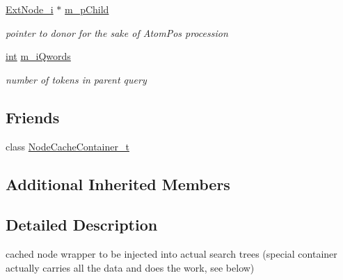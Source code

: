 \begin{DoxyCompactItemize}
\hyperlink{classExtNode__i}{Ext\-Node\-\_\-i} $\ast$ \hyperlink{classExtNodeCached__t_af2ff5acd56311745d3eb4dc63b4ce5f9}{m\-\_\-p\-Child}
\begin{DoxyCompactList}\small\item\em pointer to donor for the sake of Atom\-Pos procession \end{DoxyCompactList}\item 
\hyperlink{sphinxexpr_8cpp_a4a26e8f9cb8b736e0c4cbf4d16de985e}{int} \hyperlink{classExtNodeCached__t_a580c8b573809e90bf4bde6059e3f6132}{m\-\_\-i\-Qwords}
\begin{DoxyCompactList}\small\item\em number of tokens in parent query \end{DoxyCompactList}\end{DoxyCompactItemize}
\subsection*{Friends}
\begin{DoxyCompactItemize}
\item 
class \hyperlink{classExtNodeCached__t_ad23beeca56c9f2e242551a4306c1f8ab}{Node\-Cache\-Container\-\_\-t}
\end{DoxyCompactItemize}
\subsection*{Additional Inherited Members}


\subsection{Detailed Description}
cached node wrapper to be injected into actual search trees (special container actually carries all the data and does the work, see below) 

